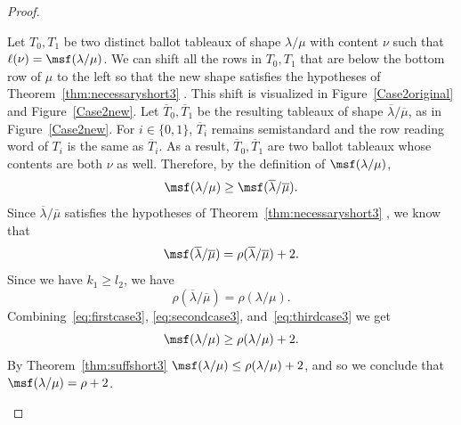 \begin{proof}
\begin{Case}
Let $T_0,T_1$ be two distinct ballot tableaux of shape $\lambda/\mu$ with content $\nu$ such that $\ell(\nu) = {\msf }(\lambda/\mu)$. We can shift all the rows in $T_0,T_1$ that are below the bottom row of $\mu$ to the left so that the new shape satisfies the hypotheses of Theorem~\ref{thm:necessaryshort3} . This shift is visualized in Figure~\ref{Case2original} and Figure~\ref{Case2new}. Let $\overline T_0,\overline T_1$ be the resulting tableaux of shape $\overline\lambda/\overline\mu$, as in Figure~\ref{Case2new}. For $i\in \{0,1\}$, $\overline T_i$ remains semistandard and the row reading word of $T_i$ is the same as $\overline T_i$. As a result, $\overline T_0,\overline T_1$ are two ballot tableaux whose contents are both $\nu$ as well. Therefore, by the definition of ${\msf }(\lambda/\mu)$, 
\begin{equation}
\label{eq:firstcase3}
{\msf }(\lambda/\mu)\geq {\msf }(\overline\lambda/\overline\mu).
\end{equation}
Since $\overline\lambda/\overline\mu$ satisfies the hypotheses of Theorem~\ref{thm:necessaryshort3} , we know that 
\begin{equation}
\label{eq:secondcase3}
{\msf }(\overline\lambda/\overline\mu) = \rho(\overline\lambda/\overline\mu) +2.
\end{equation}
Since we have $k_1\geq l_2$, we have
\begin{equation}
\label{eq:thirdcase3}
\rho(\overline\lambda/\overline\mu) = \rho(\lambda/\mu).
\end{equation}
Combining~\eqref{eq:firstcase3}, \eqref{eq:secondcase3}, and~\eqref{eq:thirdcase3} we get 
\[
{\msf }(\lambda/\mu)\geq \rho(\lambda/\mu)+2.
\]
By Theorem~\ref{thm:suffshort3} ${\msf }(\lambda/\mu)\leq \rho(\lambda/\mu)+2$, and so we conclude that ${\msf }(\lambda/\mu) = \rho+2$.


\end{Case}
\end{proof}
